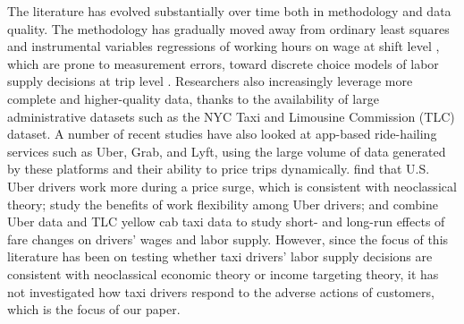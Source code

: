 \documentclass[reviewmode]{restat}
\begin{document}
The literature has evolved substantially over time  both in methodology and data quality.
The methodology has gradually moved away from ordinary least squares and instrumental variables
regressions of working hours on wage  at shift level \citep{camerer1997labor}, which are prone to
measurement errors, toward discrete choice models of labor supply decisions at trip level \citep{farber2005tomorrow,farber2015you,crawford2011new,martin2017quit}. Researchers also increasingly 
leverage more complete and higher-quality data, thanks to the availability of large administrative 
datasets such as the NYC Taxi and Limousine Commission (TLC) dataset. A number of recent studies
have also looked at app-based ride-hailing services such as Uber, Grab, and Lyft, using the large 
volume of data generated by these platforms and their ability to price trips dynamically. 
\citet{chen2015dynamic} find that U.S. Uber drivers work more during a price surge, 
which is consistent with neoclassical theory; \citet{chen2017value} study the benefits of 
work flexibility among Uber drivers; and \citet{hall2017labor} combine Uber data and TLC yellow
cab taxi data to study short- and long-run effects of fare changes on drivers' wages and labor supply. 
However, since the focus of this literature has been on testing whether taxi drivers' labor supply
decisions are consistent with neoclassical economic theory or income targeting theory, 
it has not investigated how taxi drivers respond to the adverse actions of customers, 
which is the focus of our paper.

\end{document}
